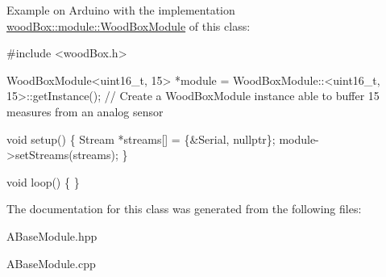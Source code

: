 Example on Arduino with the implementation \mbox{\hyperlink{classwood_box_1_1module_1_1_wood_box_module}{wood\+Box\+::module\+::\+Wood\+Box\+Module}} of this class\+:


\begin{DoxyCode}
\textcolor{preprocessor}{#include <woodBox.h>}

WoodBoxModule<uint16\_t, 15> *module = WoodBoxModule::<uint16\_t, 15>::getInstance(); \textcolor{comment}{// Create a
       WoodBoxModule instance able to buffer 15 measures from an analog sensor}

\textcolor{keywordtype}{void} setup() \{
  Stream *streams[] = \{&Serial, \textcolor{keyword}{nullptr}\};
  module->setStreams(streams);
\}

\textcolor{keywordtype}{void} loop() \{
\}
\end{DoxyCode}
 

The documentation for this class was generated from the following files\+:\begin{DoxyCompactItemize}
\item 
A\+Base\+Module.\+hpp\item 
A\+Base\+Module.\+cpp\end{DoxyCompactItemize}
